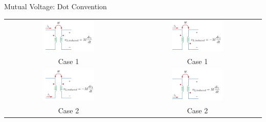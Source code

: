 \documentclass{beamer}
\begin{document}
\begin{frame}{Mutual Voltage: Dot Convention}

\begin{table}[]
    \centering
    \begin{tabular}{c|c}

        \includegraphics[width=0.42\textwidth]{C13/case11.png}
         &
        \includegraphics[width=0.42\textwidth]{C13/case22.png}
         \\
         Case 1 & Case 1 \\
        \hline
        \includegraphics[width=0.42\textwidth]{C13/case33.png}
         &
        \includegraphics[width=0.42\textwidth]{C13/case44.png}
         \\
         Case 2 & Case 2 \\
    \end{tabular}

\end{table}
\end{frame}


\end{document}

